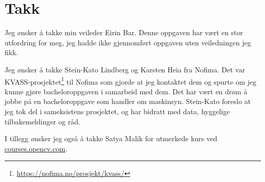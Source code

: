 \section*{Takk}

Jeg ønsker å takke min veileder Eirin Bar. Denne oppgaven har vært en stor utfordring for meg, jeg hadde ikke gjennomført oppgaven uten veiledningen jeg fikk. 

Jeg ønsker å takke Stein-Kato Lindberg og Karsten Heia fra Nofima. Det var KVASS-prosjektet\footnote{\url{https://nofima.no/prosjekt/kvass/}} til Nofima som gjorde at jeg kontaktet dem og spurte om jeg kunne gjøre bacheloroppgaven i samarbeid med dem. Det har vært en drøm å jobbe på en bacheloroppgave som handler om maskinsyn. Stein-Kato foreslo at jeg tok del i sameksistens prosjektet, og har bidratt med data, hyggelige tilbakemeldinger og råd.

I tillegg ønsker jeg også å takke Satya Malik for utmerkede kurs ved \url{courses.opencv.com}.


